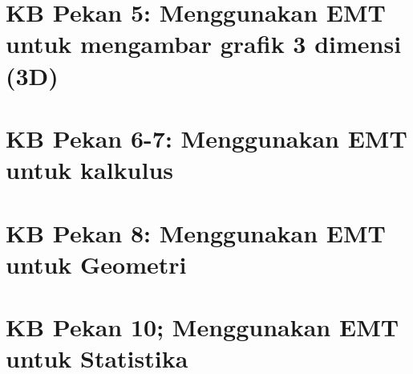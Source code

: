 \documentclass{report}
\begin{document}
\newpage
\chapter{KB Pekan 5: Menggunakan EMT untuk mengambar grafik 3 dimensi (3D)}


\newpage
\chapter{KB Pekan 6-7: Menggunakan EMT untuk kalkulus}


\newpage
\chapter{KB Pekan 8: Menggunakan EMT untuk Geometri}


\newpage
\chapter{KB Pekan 10; Menggunakan EMT untuk Statistika}

\end{document}
